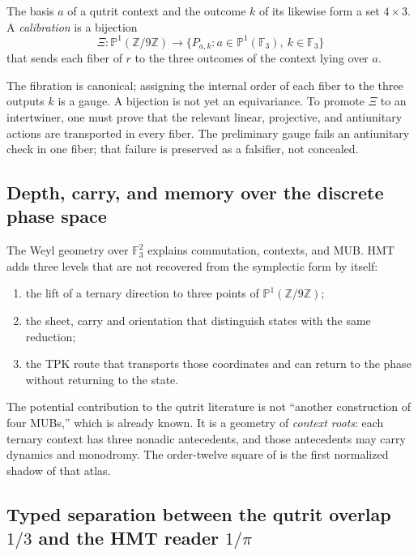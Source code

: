 The basis $a$ of a qutrit context and the outcome $k$
of its \PVM likewise form a set $4\times3$. A
\emph{calibration} is a bijection
\[
 \Xi:\mathbb P^1(\mathbb Z/9\mathbb Z)
 \longrightarrow
 \{P_{a,k}:a\in\mathbb P^1(\mathbb F_3),\ k\in\mathbb F_3\}
 \tag{GMC-5.8}
\]
that sends each fiber of $r$ to the three outcomes of the context lying over
$a$.

\begin{controlbox}
The fibration is canonical; assigning the internal order of each fiber to the
three outputs $k$ is a gauge. A bijection is not yet an
equivariance. To promote $\Xi$ to an intertwiner, one must prove that the
relevant linear, projective, and antiunitary actions are transported in
every fiber. The preliminary gauge fails an antiunitary check in one
fiber; that failure is preserved as a falsifier, not concealed.
\end{controlbox}

\subsection{Depth, carry, and memory over the discrete phase space}

The Weyl geometry over $\mathbb F_3^2$ explains commutation, contexts, and
MUB. HMT adds three levels that are not recovered from the symplectic form by
itself:

\begin{enumerate}
 \item the lift of a ternary direction to three points of
 $\mathbb P^1(\mathbb Z/9\mathbb Z)$;
 \item the sheet, carry and orientation that distinguish states with the same reduction;
 \item the TPK route that transports those coordinates and can return to the
 phase without returning to the state.
\end{enumerate}

The potential contribution to the qutrit literature is not “another construction of
four MUBs,” which is already known. It is a geometry of \emph{context roots}: each
ternary context has three nonadic antecedents, and those antecedents
may carry dynamics and monodromy. The order-twelve square of
 is the first normalized shadow of that atlas.

\subsection{Typed separation between the qutrit overlap
\texorpdfstring{$1/3$}{1/3} and the HMT reader
\texorpdfstring{$1/\pi$}{1/pi}}

